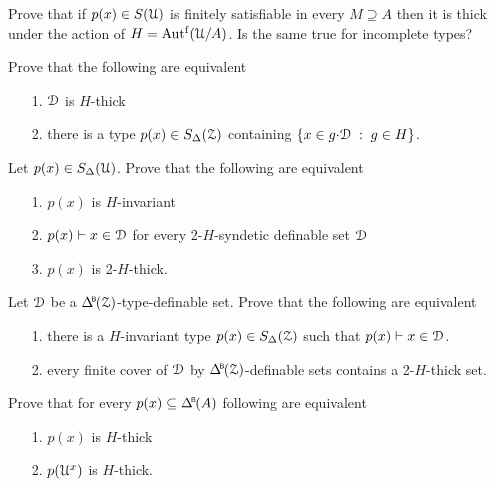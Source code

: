 \begin{exercise}
  Prove that if $p(x)\in S(\EuScript U)$ is finitely satisfiable in every $M\supseteq A$ then it is thick under the action of $H=\mbox{Aut$^{\rm f}$}(\EuScript U/A)$.
  Is the same true for incomplete types?
\end{exercise}

\begin{exercise}
  Prove that the following are equivalent
  \begin{itemize}
    \item[1.] $\EuScript D$ is $H$-thick
    \item[2.] there is a type $p(x)\in S_\Delta(\EuScript Z)$ containing $\{x\in g{\cdot}\EuScript D\;:\;g\in H\}$.
  \end{itemize}
\end{exercise}

\begin{exercise}
  Let $p(x)\in S_\Delta(\EuScript U)$.
  Prove that the following are equivalent
  \begin{itemize}
    \item[1.] $p(x)$ is $H$-invariant
    \item[2.] $p(x)\vdash x\in\EuScript D$ for every 2-$H$-syndetic definable set $\EuScript D$
    \item[3.] $p(x)$ is 2-$H$-thick.
  \end{itemize}
\end{exercise}

\begin{exercise}
  Let $\EuScript D$ be a $\BDelta(\Z)$-type-definable set.
  Prove that the following are equivalent 
  \begin{itemize}
    \item[1.] there is a $H$-invariant type $p(x)\in S_\Delta(\EuScript Z)$ such that $p(x)\vdash x\in\EuScript D$.
    \item[2.] every finite cover of $\EuScript D$ by $\BDelta(\Z)$-definable sets contains a 2-$H$-thick set.
  \end{itemize}
\end{exercise}


\begin{exercise}\label{ex_thick_types}
  Prove that for every $p(x)\subseteq \BDelta(A)$ following are equivalent
  \begin{itemize}
    \item[1.] $p(x)$ is $H$-thick
    \item[2.] $p(\EuScript U^x)$ is $H$-thick.
  \end{itemize}
\end{exercise}

